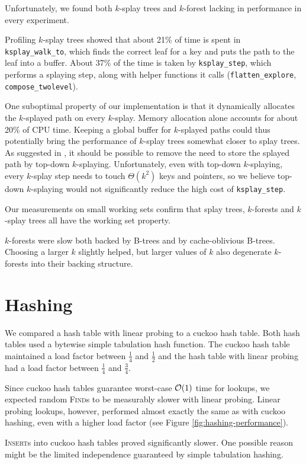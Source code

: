 Unfortunately, we found both $k$-splay trees and $k$-forest lacking in
performance in every experiment.

Profiling $k$-splay trees showed that about 21\% of time is spent in
\texttt{ksplay\_walk\_to}, which finds the correct leaf for a key and puts the
path to the leaf into a buffer. About 37\% of the time is taken by
\texttt{ksplay\_step}, which performs a splaying step, along with helper
functions it calls (\texttt{flatten\_explore}, \texttt{compose\_twolevel}).

One suboptimal property of our implementation is that it dynamically
allocates the $k$-splayed path on every $k$-splay. Memory allocation alone
accounts for about 20\% of CPU time.
Keeping a global buffer for $k$-splayed paths could thus potentially bring
the performance of $k$-splay trees somewhat closer to splay trees.
As suggested in \cite{ksplay-sherk}, it should be possible to remove the
need to store the splayed path by top-down $k$-splaying.
Unfortunately, even with top-down $k$-splaying, every $k$-splay step needs
to touch $\Theta(k^2)$ keys and pointers, so we believe top-down $k$-splaying
would not significantly reduce the high cost of \texttt{ksplay\_step}.

Our measurements on small working sets confirm that splay trees, $k$-forests
and $k$-splay trees all have the working set property.

$k$-forests were slow both backed by B-trees and by cache-oblivious B-trees.
Choosing a larger $k$ slightly helped, but larger values of $k$ also degenerate
$k$-forests into their backing structure.

\section{Hashing}
We compared a hash table with linear probing to a cuckoo hash table.
Both hash tables used a bytewise simple tabulation hash function.
The cuckoo hash table maintained a load factor between $\frac{1}{4}$ and
$\frac{1}{2}$ and the hash table with linear probing had a load factor
between $\frac{1}{4}$ and $\frac{3}{4}$.

Since cuckoo hash tables guarantee worst-case $\mathcal{O}(1)$ time for lookups,
we expected random \textsc{Find}s to be measurably slower with linear probing.
Linear probing lookups, however, performed almost exactly the same as
with cuckoo hashing, even with a higher load factor (see Figure
\ref{fig:hashing-performance}).

\textsc{Insert}s into cuckoo hash tables proved significantly slower.
One possible reason might be the limited independence guaranteed by simple
tabulation hashing.

